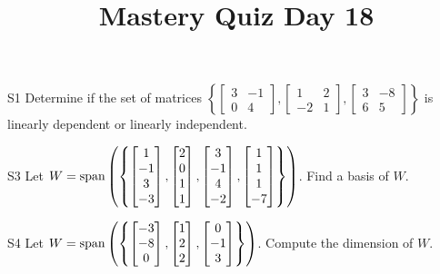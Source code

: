 \documentclass{sbgLAquiz}
\title{Mastery Quiz Day 18 }
\begin{document}
\begin{problem}{S1}
Determine if the set of matrices $\left\{\begin{bmatrix} 3 & -1 \\ 0 & 4 \end{bmatrix}, \begin{bmatrix} 1  & 2 \\ -2 & 1 \end{bmatrix}, \begin{bmatrix} 3 & -8 \\ 6 & 5 \end{bmatrix} \right\}$  is linearly dependent or linearly independent.
\end{problem}

\begin{problem}{S3}
Let $W={\rm span}\left( \left\{ \begin{bmatrix} 1 \\ -1 \\ 3 \\ -3 \end{bmatrix},\begin{bmatrix} 2 \\ 0 \\ 1 \\ 1 \end{bmatrix}, \begin{bmatrix} 3 \\ -1 \\ 4 \\ -2 \end{bmatrix},  \begin{bmatrix} 1 \\ 1 \\ 1 \\ -7 \end{bmatrix} \right\}\right)$.  Find a basis of $W$.
\end{problem}
\newpage

\begin{problem}{S4}
Let $W = {\rm span} \left( \left\{  \begin{bmatrix} -3 \\ -8 \\ 0 \end{bmatrix}, \begin{bmatrix} 1 \\ 2 \\ 2 \end{bmatrix}, \begin{bmatrix} 0 \\ -1 \\ 3 \end{bmatrix} \right\} \right)$.  Compute the dimension of $W$.
\end{problem}
\end{document}
